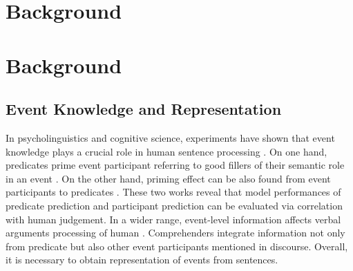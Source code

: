 \documentclass[a4paper]{article}
\begin{document}
\section{Background}
\section{Background}
\subsection{Event Knowledge and Representation} \label{sec:event}
In psycholinguistics and cognitive science, experiments have shown that event knowledge plays a crucial role in human sentence processing \citep{camblin2007interplay}. On one hand, predicates prime event participant referring to good fillers of their semantic role in an event \citep{ferretti2001integrating}. On the other hand, priming effect can be also found from event participants to predicates \citep{mcrae2005basis}. These two works reveal that model performances of predicate prediction and participant prediction can be evaluated via correlation with human judgement. In a wider range, event-level information affects verbal arguments processing of human \citep{bicknell2010effects}. Comprehenders integrate information not only from predicate but also other event participants mentioned in discourse. Overall, it is necessary to obtain representation of events from sentences. 
\end{document}
